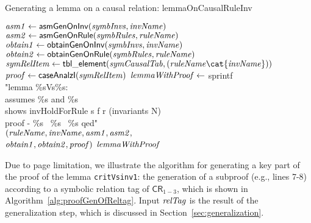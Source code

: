 \begin{algorithm}[!t]
\caption{Generating a lemma on a causal relation: lemmaOnCausalRuleInv}
\label{alg:lemmaOnCausalRuleInv}
{
 ${\it asm1} \leftarrow {\sf asmGenOnInv}({\it symbInvs},{\it invName})$\;
 ${\it asm2} \leftarrow {\sf asmGenOnRule}({\it symbRules},{\it ruleName})$\;
 ${\it obtain1} \leftarrow {\sf obtainGenOnInv}({\it symbInvs},{\it invName})$\;
 ${\it obtain2}\leftarrow {\sf obtainGenOnRule}({\it symbRules},{\it ruleName})  $\;
 ${\it symRelItem} \leftarrow {\sf tbl\_element}({\it symCausalTab},({\it ruleName}\cat {\it invName}))$\;
 ${\it proof} \leftarrow {\sf caseAnalzI}({\it symRelItem})$\;
 ${\it lemmaWithProof} \leftarrow$ sprintf \\
\twoSpaces"lemma \%sVs\%s:\\
\twoSpaces assumes \%s and \%s\\
\twoSpaces  shows  invHoldForRule s f r (invariants   N)\\
\twoSpaces  proof -
\twoSpaces \%s~ \%s~  \%s
\twoSpaces qed"\\
\twoSpaces ${\it (ruleName, invName, asm1,asm2,}$ \\
\twoSpaces\twoSpaces ${\it obtain1, obtain2, proof)}$ \;
    \Return ${\it lemmaWithProof}$
}
\end{algorithm}

Due to page limitation,
we illustrate the algorithm  for generating  a key part of the proof of the lemma {\tt critVsinv1}:
the generation of a subproof (e.g., lines 7-8) according to a symbolic  relation tag of $\mathsf{CR}_{1-3}$,
which is shown in Algorithm~\ref{alg:proofGenOfReltag}.
Input ${\it relTag}$ is the result of the generalization step,
which is discussed in Section~\ref{sec:generalization}.

